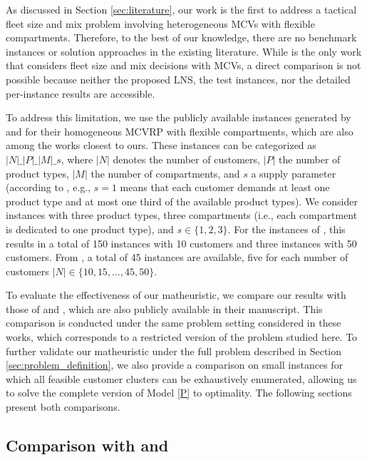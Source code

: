 \documentclass[11pt]{elsarticle}
\theoremstyle{plain}
\newcommand{\blue}[1]{#1}
\begin{document}
As discussed in Section \ref{sec:literature}, our work is the first to address a tactical fleet size and mix problem involving heterogeneous \acp{MCV} with flexible compartments. Therefore, to the best of our knowledge, there are no benchmark instances or solution approaches in the existing literature. 
\blue{While \cite{OstermeierHübner2018} is the only work that considers fleet size and mix decisions with \acp{MCV}, a direct comparison is not possible because neither the proposed \ac{LNS}, the test instances, nor the detailed per-instance results are accessible.}

To address this limitation, we use the publicly available instances generated by \cite{henke2015multi} and \cite{henke2019branch} for their homogeneous \ac{MCVRP} with flexible compartments, which are \blue{also among} the works closest to ours. These instances can be categorized as $|N|\_|P|\_|M|\_s$, where $|N|$ denotes the number of customers, $|P|$ the number of product types, $|M|$ the number of compartments, and $s$ a supply parameter (according to \cite{henke2015multi}, e.g., $s=1$ means that each customer demands at least one product type and at most one third of the available product types). We consider instances with three product types, three compartments (i.e., each compartment is dedicated to one product type), and $s \in \{1,2,3\}$. For the instances of \cite{henke2015multi}, this results in a total of 150 instances with 10 customers and three instances with 50 customers. From \cite{henke2019branch}, a total of 45 instances are available, five for each number of customers $|N| \in \{10,15,..., 45, 50\}$.

To evaluate the effectiveness of our matheuristic, we compare our results with those of \cite{henke2015multi} and \cite{henke2019branch}, which are also publicly available in their manuscript. \blue{This comparison is conducted under the same problem setting considered in these works, which corresponds to a restricted version of the problem studied here. To further validate our matheuristic under the full problem described in Section \ref{sec:problem_definition}, we also provide a comparison on small instances for which all feasible customer clusters can be exhaustively enumerated, allowing us to solve the complete version of Model \eqref{P} to optimality. The following sections present both comparisons.} 

\subsection{\blue{Comparison with \cite{henke2015multi} and \cite{henke2019branch}}}
\end{document}
